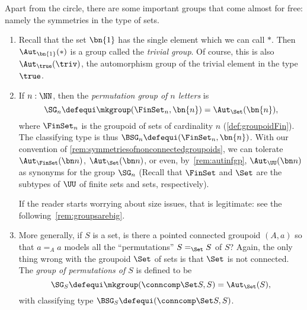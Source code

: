 \begin{example}\label{ex:groups}
  Apart from the circle, there are some important groups that come almost for free:
  namely the symmetries in the type of sets.
  \begin{enumerate}
  \item Recall that the set $\bn{1}$ has the single element
    which we can call $*$. Then
    $\Aut_{\bn{1}}(*)$ is a group called the \emph{trivial group}.
    Of course, this is also $\Aut_{\true}(\triv)$,
    the automorphism group of the trivial element in the type $\true$.
  \item If $n:\NN$, then the \emph{permutation group of $n$ letters} is
    \[
      \SG_n\defequi \mkgroup(\FinSet_n,\bn{n}) = \Aut_{\Set}(\bn{n}),
    \]
    where $\FinSet_n$ is the groupoid of sets of cardinality $n$
    (\cf \ref{def:groupoidFin}).
    The classifying type is thus $\BSG_n\defequi (\FinSet_n,\bn{n})$.
    With our convention of \cref{rem:symmetriesofnonconnectedgroupoids},
    we can tolerate $\Aut_{\FinSet}(\bn n)$, $\Aut_{\Set}(\bn n)$,
    or even, by~\cref{rem:autinfgp}, $\Aut_{\UU}(\bn n)$
    as synonyms for the group $\SG_n$
    (Recall that $\FinSet$ and $\Set$ are the subtypes of $\UU$
    of finite sets and sets, respectively).

    If the reader starts worrying about size issues, that is legitimate:
    see the following~\cref{rem:groupsarebig}.
  \item More generally, if $S$ is a set, is there a pointed connected groupoid $(A,a)$ so that $a=_Aa$ models all the ``permutations'' $S=_{\Set}S$ of $S$?
    Again, the only thing wrong with the groupoid $\Set$ of sets
    is that $\Set$ is not connected.
    The \emph{group of permutations of $S$} is defined to be
    \[
      \SG_S\defequi \mkgroup(\conncomp\Set S,S) = \Aut_{\Set}(S),
    \]
    with classifying type $\BSG_S\defequi(\conncomp \Set S,S)$.\qedhere
  \end{enumerate}
\end{example}

